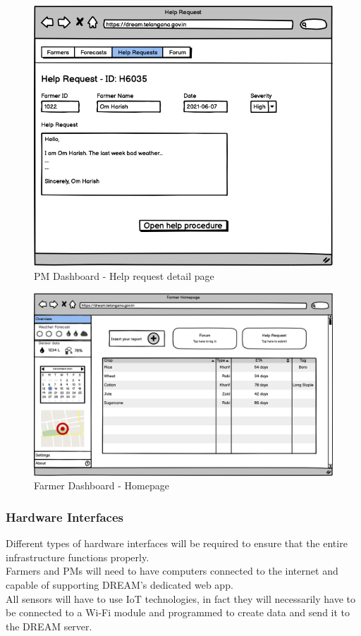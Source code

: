 \documentclass[10pt]{article}
\begin{document}
\begin{figure}[ht!]
    \centering
    \includegraphics[scale=0.40]{ui/pm_helpdetail.png}
    \caption{PM Dashboard - Help request detail page}
\end{figure}
\begin{figure}[ht!]
    \centering
    \includegraphics[scale=0.15]{ui/f_homepage.png}
    \caption{Farmer Dashboard - Homepage}
\end{figure}
\newpage
\subsubsection{Hardware Interfaces}
Different types of hardware interfaces will be required to ensure that the entire infrastructure functions properly.\\
Farmers and PMs will need to have computers connected to the internet and capable of supporting DREAM's dedicated web app.\\
All sensors will have to use IoT technologies, in fact they will necessarily have to be connected to a Wi-Fi module and programmed to create data and send it to the DREAM server. 
\end{document}
